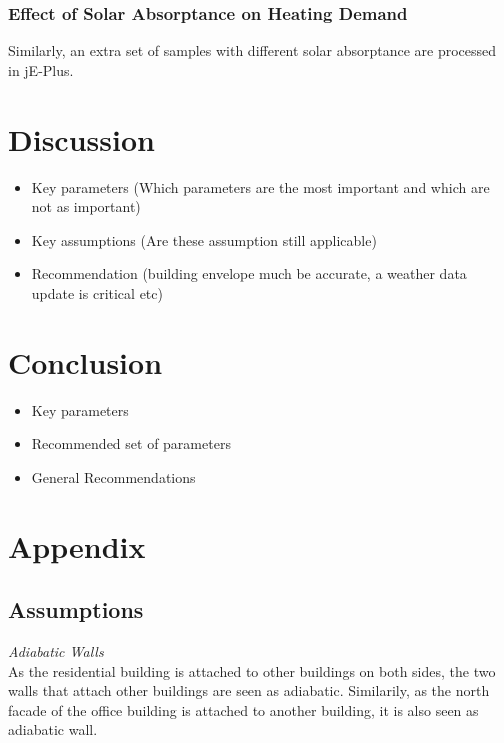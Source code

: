 \documentclass[11pt, a4paper]{article}
\theoremstyle{definition}
\begin{document}
        \subsubsection{Effect of Solar Absorptance on Heating Demand}
			Similarly, an extra set of samples with different solar absorptance are processed in jE-Plus.

\newpage
\section{Discussion}

		\begin{itemize}
		\item Key parameters (Which parameters are the most important and which are not as important)
		\item Key assumptions (Are these assumption still applicable)
		\item Recommendation (building envelope much be accurate, a weather data update is critical etc)
	\end{itemize}






\newpage			
\section{Conclusion}
	\begin{itemize}
		\item Key parameters
		\item Recommended set of parameters
		\item General Recommendations
	\end{itemize}


\newpage
\printbibliography



\section{Appendix}
\subsection{Assumptions}

	\textit{Adiabatic Walls}\\
	As the residential building is attached to other buildings on both sides, the two walls that attach other buildings are seen as adiabatic. Similarily, as the north facade of the office building is attached to another building, it is also seen as adiabatic wall.\\
\end{document}
